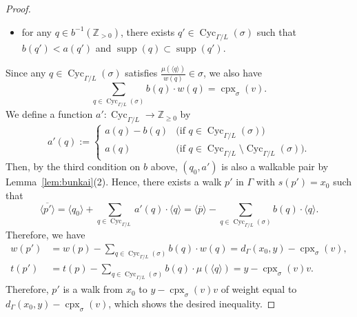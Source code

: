 \documentclass[11pt]{article}
\theoremstyle{definition}
\numberwithin{equation}{section}
\begin{document}
\begin{proof}
\begin{itemize}
\item
for any $q \in b^{-1}(\mathbb{Z}_{>0})$, 
there exists $q' \in \operatorname{Cyc}_{\Gamma /L}(\sigma)$ 
such that $b(q') < a(q')$ and $\operatorname{supp}(q) \subset \operatorname{supp}(q')$. 
\end{itemize}
Since any $q \in \operatorname{Cyc}_{\Gamma /L}(\sigma)$ satisfies $\frac{\mu(\langle q \rangle)}{w(q)} \in \sigma$, 
we also have 
\[
\sum _{q \in \operatorname{Cyc}_{\Gamma /L}(\sigma)} b(q) \cdot w(q) = \operatorname{cpx}_{\sigma}(v). 
\]
We define a function $a' : \operatorname{Cyc}_{\Gamma /L} \to \mathbb{Z}_{\ge 0}$ by 
\[
a'(q) := 
\begin{cases}
a(q) - b(q) & \text{(if $q \in \operatorname{Cyc}_{\Gamma /L}(\sigma)$)} \\
a(q)  & \text{(if $q \in \operatorname{Cyc}_{\Gamma /L} \setminus \operatorname{Cyc}_{\Gamma /L}(\sigma)$)}. 
\end{cases}
\]
Then, by the third condition on $b$ above, 
$(q_0, a')$ is also a walkable pair by Lemma~\ref{lem:bunkai}(2). 
Hence, there exists a walk $p'$ in $\Gamma$ with $s(p') = x_0$ such that 
\[
\langle \overline{p'} \rangle = \langle q_0 \rangle + \sum _{q \in \operatorname{Cyc}_{\Gamma /L}} a'(q) \cdot \langle q \rangle
= \langle \overline{p} \rangle - \sum _{q \in \operatorname{Cyc}_{\Gamma /L}(\sigma)} b(q) \cdot \langle q \rangle. 
\]
Therefore, we have
\begin{align*}
w(p') 
&= w(p) - \sum _{q \in \operatorname{Cyc}_{\Gamma /L}(\sigma)} b(q) \cdot w(q)
= d_{\Gamma}( x_0, y) - \operatorname{cpx}_{\sigma}(v), \\
t(p') 
&= t(p) - \sum _{q \in \operatorname{Cyc}_{\Gamma /L}(\sigma)} b(q) \cdot  \mu(\langle q \rangle) 
= y  - \operatorname{cpx}_{\sigma}(v)v. 
\end{align*}
Therefore, $p'$ is a walk from $x_0$ to $y - \operatorname{cpx}_{\sigma}(v)v$ of weight 
equal to $d_{\Gamma}( x_0, y) - \operatorname{cpx}_{\sigma}(v)$, which shows the desired inequality. 
\end{proof}
\end{document}
